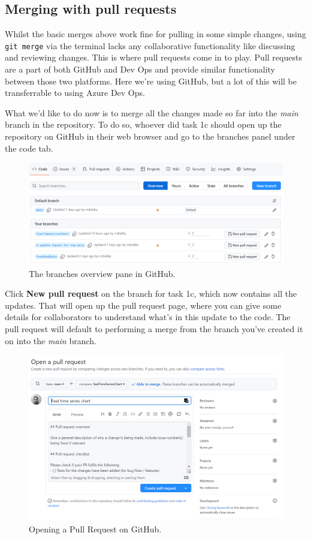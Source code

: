 \documentclass[
  12pt,
]{article}
\begin{document}
\hypertarget{merging-with-pull-requests}{%
\subsection{Merging with pull
requests}\label{merging-with-pull-requests}}

Whilst the basic merges above work fine for pulling in some simple
changes, using \texttt{git\ merge} via the terminal lacks any
collaborative functionality like discussing and reviewing changes. This
is where pull requests come in to play. Pull requests are a part of both
GitHub and Dev Ops and provide similar functionality between those two
platforms. Here we're using GitHub, but a lot of this will be
transferrable to using Azure Dev Ops.

What we'd like to do now is to merge all the changes made so far into
the \emph{main} branch in the repository. To do so, whoever did task 1c
should open up the repository on GitHub in their web browser and go to
the branches panel under the code tab.

\begin{figure}

{\centering \includegraphics[width=0.64\linewidth]{images/gitdemo/gitdemo-GitHub-Branches} 

}

\caption{The branches overview pane in GitHub.}\label{fig:unnamed-chunk-15}
\end{figure}

Click \textbf{New pull request} on the branch for task 1c, which now
contains all the updates. That will open up the pull request page, where
you can give some details for collaborators to understand what's in this
update to the code. The pull request will default to performing a merge
from the branch you've created it on into the \emph{main} branch.

\begin{figure}

{\centering \includegraphics[width=0.64\linewidth]{images/gitdemo/gitdemo-GitHub-OpenPullRequest} 

}

\caption{Opening a Pull Request on GitHub.}\label{fig:unnamed-chunk-16}
\end{figure}
\end{document}

